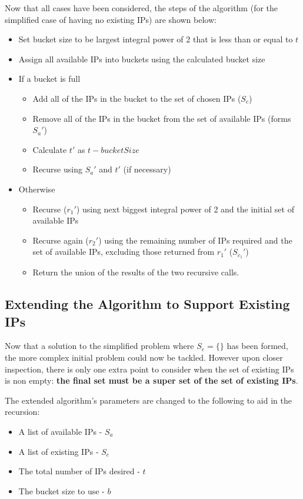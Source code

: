 Now that all cases have been considered, the steps of the algorithm (for the simplified case of having no existing IPs) are shown below:
\begin{itemize}
\item{Set bucket size to be largest integral power of 2 that is less than or equal to $t$}
\item{Assign all available IPs into buckets using the calculated bucket size}
\item{If a bucket is full}
  \begin{itemize}
  \item{Add all of the IPs in the bucket to the set of chosen IPs ($S_c$)}
  \item{Remove all of the IPs in the bucket from the set of available IPs (forms $S_a'$)}
  \item{Calculate $t'$ as $t - bucketSize$}
  \item{Recurse using $S_a'$ and $t'$ (if necessary)}
  \end{itemize}
\item{Otherwise}
  \begin{itemize}
  \item{Recurse ($r_1'$) using next biggest integral power of 2 and the initial set of available IPs}
  \item{Recurse again ($r_2'$) using the remaining number of IPs required and the set of available IPs, excluding those returned from $r_1'$ ($S_{c_1}'$)}
  \item{Return the union of the results of the two recursive calls.}
  \end{itemize}
\end{itemize}

\subsection{Extending the Algorithm to Support Existing IPs}
Now that a solution to the simplified problem where $S_e = \{\}$ has been formed, the more complex initial problem could now be tackled. However upon closer inspection, there is only one extra point to consider when the set of existing IPs is non empty: \textbf{the final set must be a super set of the set of existing IPs}. 

The extended algorithm's parameters are changed to the following to aid in the recursion:

\begin{itemize}
\item{A list of available IPs - $S_a$}
\item{A list of existing IPs - $S_e$}
\item{The total number of IPs desired - $t$}
\item{The bucket size to use - $b$}
\end{itemize}

